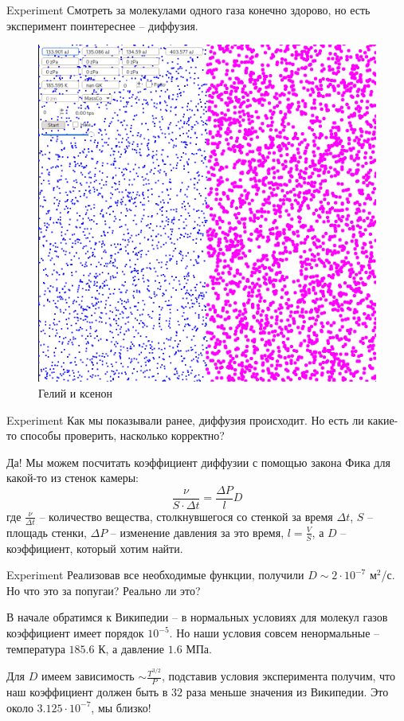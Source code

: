 \documentclass{beamer}
\begin{document}
\begin{frame}{Experiment}
  Смотреть за молекулами одного газа конечно здорово, но есть эксперимент поинтереснее -- диффузия.

  \begin{figure}
    \includegraphics[scale=0.11]{diffusion.png}
    \caption{Гелий и ксенон}
  \end{figure}
\end{frame}

\begin{frame}{Experiment}
  Как мы показывали ранее, диффузия происходит. Но есть ли какие-то способы проверить, насколько корректно? 
  
  \pause[2]
  Да! Мы можем посчитать коэффициент диффузии с помощью закона Фика для какой-то из стенок камеры:
  \[
    \frac{\nu}{S\cdot \Delta t} = \frac{\Delta P}{l}D 
  \]
  где $\frac{\nu}{\Delta t}$ -- количество вещества, столкнувшегося со стенкой за время $\Delta t$, $S$ -- площадь стенки, $\Delta P$ -- изменение давления за это время, $l = \frac{V}{S}$, а $D$ -- коэффициент, который хотим найти.
\end{frame}

\begin{frame}{Experiment}
  Реализовав все необходимые функции, получили $D \sim 2 \cdot 10^{-7}$ $\text{м}^2$/с. Но что это за попугаи? Реально ли это?

  \pause[2]
  В начале обратимся к Википедии -- в нормальных условиях для молекул газов коэффициент имеет порядок $10^{-5}$. Но наши условия совсем ненормальные -- температура $185.6$ К, а давление $1.6$ МПа. 

  Для $D$ имеем зависимость $\sim \frac{T^{3/2}}{P}$, подставив условия эксперимента получим, что наш коэффициент должен быть в $32$ раза меньше значения из Википедии. Это около $3.125 \cdot 10^{-7}$, мы близко!
\end{frame}
\end{document}
